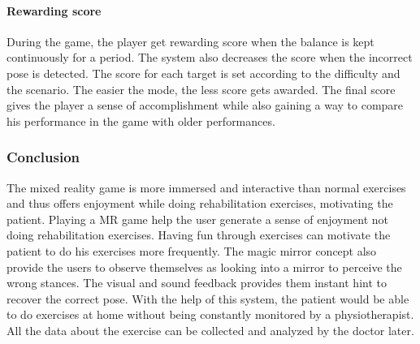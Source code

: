 \paragraph{Rewarding score} During the game, the player get rewarding score when the balance is kept continuously for a period. The system also decreases the score when the incorrect pose is detected. 
The score for each target is set according to the difficulty and the scenario. The easier the mode, the less score gets awarded. The final score gives the player a sense of accomplishment while also gaining a way to compare his performance in the game with older performances. 

\subsubsection{Conclusion}
The mixed reality game is more immersed and interactive than normal exercises and thus offers enjoyment while doing rehabilitation exercises, motivating the patient. Playing a MR game help the user generate a sense of enjoyment not doing rehabilitation exercises. Having fun through exercises can motivate the patient to do his exercises more frequently. The magic mirror concept also provide the users to observe themselves as looking into a mirror to perceive the wrong stances. The visual and sound feedback provides them instant hint to recover the correct pose. With the help of this system, the patient would be able to do exercises at home without being constantly monitored by a physiotherapist. All the data about the exercise can be collected and analyzed by the doctor later.
